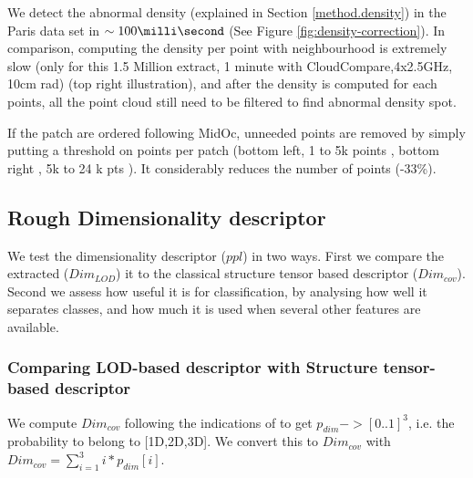 		We detect the abnormal density (explained in Section \ref{method.density}) in the Paris data set in $\sim 100 \milli \second$ 
		(See Figure \ref{fig:density-correction}). 
		In comparison, computing the density per point with neighbourhood is extremely slow (only for this 1.5 Million extract, 1 minute with CloudCompare,4x2.5GHz, 10cm rad) (top right illustration), and after the density is computed for each points, all the point cloud still need to be filtered to find abnormal density spot.
		
		If the patch are ordered following MidOc, unneeded points are removed by simply putting a threshold on points per patch (bottom left, 1 to 5k points \per \cubic \meter , bottom right , 5k to 24 k pts \per \cubic \meter). It considerably reduces the number of points (-33\%). 
	
	\subsection{Rough Dimensionality descriptor}
		\label{result.dim_descriptor}
		We test the dimensionality descriptor ($ppl$) in two ways.
		First we compare the extracted ($Dim_{LOD}$) it to the classical structure tensor based descriptor ($Dim_{cov}$).
		Second we assess how useful it is for classification, 
		by analysing how well it separates classes, and how much it is used when 
		several other features are available.
		
		\subsubsection{Comparing LOD-based descriptor with Structure tensor-based descriptor}
		We compute $Dim_{cov}$ following the indications of \cite{Weinmann2015} to get $p_{dim}->[0..1]^3$, i.e. the probability to belong to [1D,2D,3D].
		We convert this to $Dim_{cov}$ with $Dim_{cov}=\sum_{i=1}^{3}{i*p_{dim}[i]}$.
		
